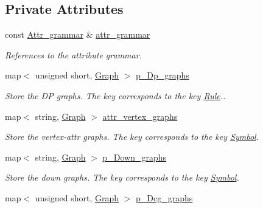 \subsection*{Private Attributes}
\begin{CompactItemize}
\item 
const \hyperlink{classgenevalmag_1_1Attr__grammar}{Attr\_\-grammar} \& \hyperlink{classgenevalmag_1_1Builder__graphs_10e4acb76015aeea26cf61980a3c6e33}{attr\_\-grammar}
\begin{CompactList}\small\item\em References to the attribute grammar. \item\end{CompactList}\item 
map$<$ unsigned short, \hyperlink{namespacegenevalmag_4a96de9ebfc7d48233406ab9cad55cb5}{Graph} $>$ \hyperlink{classgenevalmag_1_1Builder__graphs_2f001cd797840683731d524214cd6d13}{p\_\-Dp\_\-graphs}
\begin{CompactList}\small\item\em Store the DP graphs. The key corresponds to the key \hyperlink{classgenevalmag_1_1Rule}{Rule}.. \item\end{CompactList}\item 
map$<$ string, \hyperlink{namespacegenevalmag_4a96de9ebfc7d48233406ab9cad55cb5}{Graph} $>$ \hyperlink{classgenevalmag_1_1Builder__graphs_e5a3713f467704d2e3dc67da86ded862}{attr\_\-vertex\_\-graphs}
\begin{CompactList}\small\item\em Store the vertex-attr graphs. The key corresponds to the key \hyperlink{classgenevalmag_1_1Symbol}{Symbol}. \item\end{CompactList}\item 
map$<$ string, \hyperlink{namespacegenevalmag_4a96de9ebfc7d48233406ab9cad55cb5}{Graph} $>$ \hyperlink{classgenevalmag_1_1Builder__graphs_05fcf30d7286884794303103544979c4}{p\_\-Down\_\-graphs}
\begin{CompactList}\small\item\em Store the down graphs. The key corresponds to the key \hyperlink{classgenevalmag_1_1Symbol}{Symbol}. \item\end{CompactList}\item 
map$<$ unsigned short, \hyperlink{namespacegenevalmag_4a96de9ebfc7d48233406ab9cad55cb5}{Graph} $>$ \hyperlink{classgenevalmag_1_1Builder__graphs_fe54574f0045851288fae27ce01a8f4f}{p\_\-Dcg\_\-graphs}

\end{CompactItemize}
